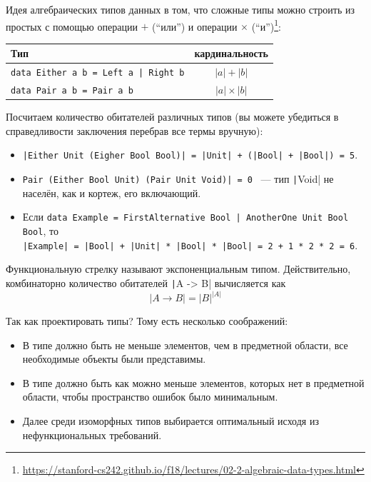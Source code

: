 Идея алгебраических типов данных в том, что сложные типы можно строить из простых с помощью операции $+$ (``или'') и операции $\times$ (``и'')\footnote{\url{https://stanford-cs242.github.io/f18/lectures/02-2-algebraic-data-types.html}}:
\begin{center}
    \begin{tabular}{|l|c|}
        \hline
        Тип                                                      & кардинальность   \\
        \hline
        \texttt{data Either a b = Left a | Right b} & $|a| + |b|$      \\
        \texttt{data Pair a b = Pair a b}           & $|a| \times |b|$ \\
        \hline
    \end{tabular}
\end{center}

Посчитаем количество обитателей различных типов (вы можете убедиться в справедливости заключения перебрав все термы вручную):
\begin{itemize}
    \item \texttt{|Either Unit (Eigher Bool Bool)| = |Unit| + (|Bool| + |Bool|) = 5}.
    \item \texttt{Pair (Either Bool Unit) (Pair Unit Void)| = 0} ~--- тип \texttt|Void| не населён, как и кортеж, его включающий.
    \item Если \texttt{data Example = FirstAlternative Bool | AnotherOne Unit Bool Bool}, то \\\texttt{|Example| = |Bool| + |Unit| * |Bool| * |Bool| = 2 + 1 * 2 * 2 = 6}.
\end{itemize}

Функциональную стрелку называют экспоненциальным типом.
Действительно, комбинаторно количество обитателей \texttt|A -> B| вычисляется как \[|A \to B| = |B|^{|A|}\]

Так как проектировать типы?
Тому есть несколько соображений:
\begin{itemize}
    \item В типе должно быть не меньше элементов, чем в предметной области, все необходимые объекты были представимы.
    \item В типе должно быть как можно меньше элементов, которых нет в предметной области, чтобы пространство ошибок было минимальным.
    \item Далее среди изоморфных типов выбирается оптимальный исходя из нефункциональных требований.
\end{itemize}

